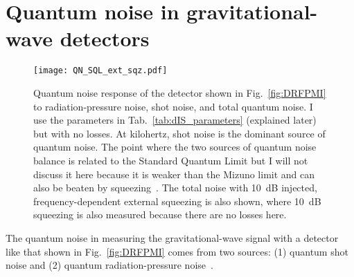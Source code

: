 \section{Quantum noise in gravitational-wave detectors}
\label{sec:qnoise_GW_IFO}


\begin{figure}[ht]
	\centering
	\texttt{[image: QN\_SQL\_ext\_sqz.pdf]}
	\caption{ Quantum noise response of the detector shown in Fig.~\ref{fig:DRFPMI} to radiation-pressure noise, shot noise, and total quantum noise. I use the parameters in Tab.~\ref{tab:dIS_parameters} (explained later) but with no losses. At kilohertz, shot noise is the dominant source of quantum noise. The point where the two sources of quantum noise balance is related to the Standard Quantum Limit but I will not discuss it here because it is weaker than the Mizuno limit and can also be beaten by squeezing~\cite{miaoFundamentalQuantumLimit2017}.
	The total noise with 10~dB injected, frequency-dependent external squeezing is also shown, where 10~dB squeezing is also measured because there are no losses here. %
	} %
	\label{fig:simplifed_QN_response_conventional}
\end{figure}

The quantum noise in measuring the gravitational-wave signal with a detector like that shown in Fig.~\ref{fig:DRFPMI} comes from two sources: (1) quantum shot noise and (2) quantum radiation-pressure noise~\cite{PhysRevD.23.1693,corbitt_2003}.


